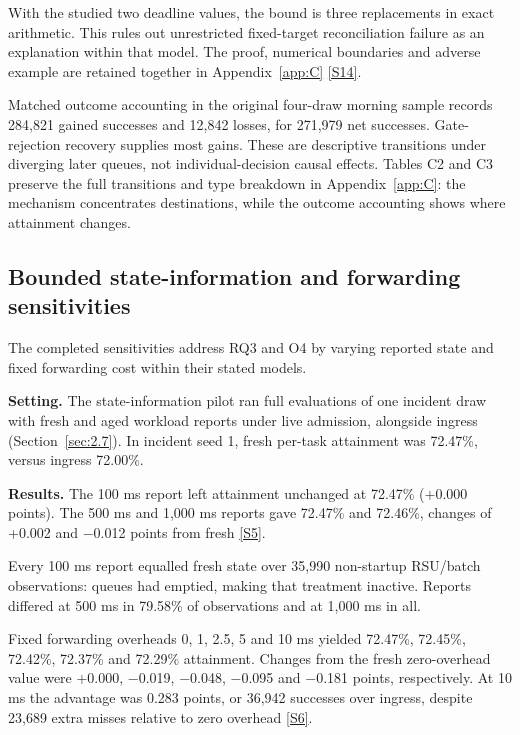 \documentclass[12pt,a4paper]{article}
\begin{document}
With the studied two deadline values, the bound is three replacements in exact arithmetic. This rules out unrestricted fixed-target reconciliation failure as an explanation within that model. The proof, numerical boundaries and adverse example are retained together in Appendix~\ref{app:C} \hyperref[source-s14]{[S14]}.

Matched outcome accounting in the original four-draw morning sample records 284,821 gained successes and 12,842 losses, for 271,979 net successes. Gate-rejection recovery supplies most gains. These are descriptive transitions under diverging later queues, not individual-decision causal effects. Tables C2 and C3 preserve the full transitions and type breakdown in Appendix~\ref{app:C}: the mechanism concentrates destinations, while the outcome accounting shows where attainment changes.

\FloatBarrier
\subsection{Bounded state-information and forwarding sensitivities}\label{sec:3.6}

The completed sensitivities address RQ3 and O4 by varying reported state and fixed forwarding cost within their stated models.

\textbf{Setting.} The state-information pilot ran full evaluations of one incident draw with fresh and aged workload reports under live admission, alongside ingress (Section~\ref{sec:2.7}). In incident seed 1, fresh per-task attainment was 72.47\%, versus ingress 72.00\%.

\textbf{Results.} The 100 ms report left attainment unchanged at 72.47\% (+0.000 points). The 500 ms and 1,000 ms reports gave 72.47\% and 72.46\%, changes of +0.002 and \ensuremath{-}0.012 points from fresh \hyperref[source-s5]{[S5]}.

Every 100 ms report equalled fresh state over 35,990 non-startup RSU/batch observations: queues had emptied, making that treatment inactive. Reports differed at 500 ms in 79.58\% of observations and at 1,000 ms in all.

Fixed forwarding overheads 0, 1, 2.5, 5 and 10 ms yielded 72.47\%, 72.45\%, 72.42\%, 72.37\% and 72.29\% attainment. Changes from the fresh zero-overhead value were +0.000, \ensuremath{-}0.019, \ensuremath{-}0.048, \ensuremath{-}0.095 and \ensuremath{-}0.181 points, respectively. At 10 ms the advantage was 0.283 points, or 36,942 successes over ingress, despite 23,689 extra misses relative to zero overhead \hyperref[source-s6]{[S6]}.
\end{document}
